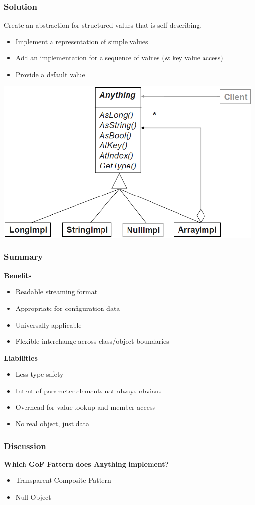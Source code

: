 \subsubsection{Solution}
Create an abstraction for structured values that is self describing.
\begin{itemize}
    \item Implement a representation of simple values
    \item Add an implementation for a sequence of values (\& key value access)
    \item Provide a default value
\end{itemize}
\includegraphics[width=\linewidth]{./img/anything_uml.png}
\subsubsection{Summary}
\textbf{Benefits}
\begin{itemize}
    \item Readable streaming format
    \item Appropriate for configuration data
    \item Universally applicable
    \item Flexible interchange across class/object boundaries
\end{itemize}
\textbf{Liabilities}
\begin{itemize}
    \item Less type safety
    \item Intent of parameter elements not always obvious
    \item Overhead for value lookup and member access
    \item No real object, just data
\end{itemize}
\subsubsection{Discussion}
\textbf{Which GoF Pattern does Anything implement?}
\begin{itemize}
    \item Transparent Composite Pattern
    \item Null Object
\end{itemize}
